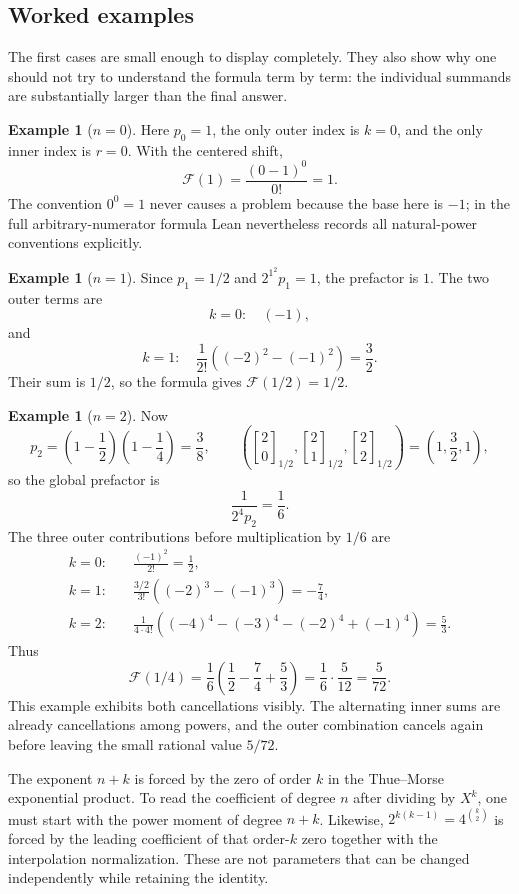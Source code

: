 \documentclass[11pt,oneside]{article}
\theoremstyle{definition}
\newtheorem{example}[theorem]{Example}
\theoremstyle{remark}
\newcommand{\halfqbinom}[2]{{\genfrac{[}{]}{0pt}{}{#1}{#2}}_{1/2}}
\newcommand{\F}{\mathcal F}
\begin{document}
\subsection{Worked examples}

The first cases are small enough to display completely.  They also show why
one should not try to understand the formula term by term: the individual
summands are substantially larger than the final answer.

\begin{example}[$n=0$]
Here $p_0=1$, the only outer index is $k=0$, and the only inner index is
$r=0$.  With the centered shift,
\[
 \F(1)=\frac{(0-1)^0}{0!}=1.
\]
The convention $0^0=1$ never causes a problem because the base here is
$-1$; in the full arbitrary-numerator formula Lean nevertheless records all
natural-power conventions explicitly.
\end{example}

\begin{example}[$n=1$]
Since $p_1=1/2$ and $2^{1^2}p_1=1$, the prefactor is $1$.  The two outer
terms are
\[
 k=0:\quad (-1),
\]
and
\[
 k=1:\quad
 \frac1{2!}\left((-2)^2-(-1)^2\right)=\frac32.
\]
Their sum is $1/2$, so the formula gives $\F(1/2)=1/2$.
\end{example}

\begin{example}[$n=2$]
Now
\[
 p_2=\left(1-\frac12\right)\left(1-\frac14\right)=\frac38,
 \qquad
 \left(\halfqbinom{2}{0},\halfqbinom{2}{1},
       \halfqbinom{2}{2}\right)
 =\left(1,\frac32,1\right),
\]
so the global prefactor is
\[
 \frac1{2^4p_2}=\frac16.
\]
The three outer contributions before multiplication by $1/6$ are
\begin{align*}
 k=0:&\quad \frac{(-1)^2}{2!}=\frac12,\\
 k=1:&\quad \frac{3/2}{3!}
 \left((-2)^3-(-1)^3\right)=-\frac74,\\
 k=2:&\quad \frac1{4\cdot4!}
 \left((-4)^4-(-3)^4-(-2)^4+(-1)^4\right)=\frac53.
\end{align*}
Thus
\[
 \F(1/4)=\frac16\left(\frac12-\frac74+\frac53\right)
 =\frac16\cdot\frac5{12}=\frac5{72}.
\]
This example exhibits both cancellations visibly.  The alternating inner
sums are already cancellations among powers, and the outer combination
cancels again before leaving the small rational value $5/72$.
\end{example}

\begin{greenbox}
The exponent $n+k$ is forced by the zero of order $k$ in the Thue--Morse
exponential product.  To read the coefficient of degree $n$ after dividing
by $X^k$, one must start with the power moment of degree $n+k$.  Likewise,
$2^{k(k-1)}=4^{\binom{k}{2}}$ is forced by the leading coefficient of that
order-$k$ zero together with the interpolation normalization.  These are not
parameters that can be changed independently while retaining the identity.
\end{greenbox}
\end{document}

